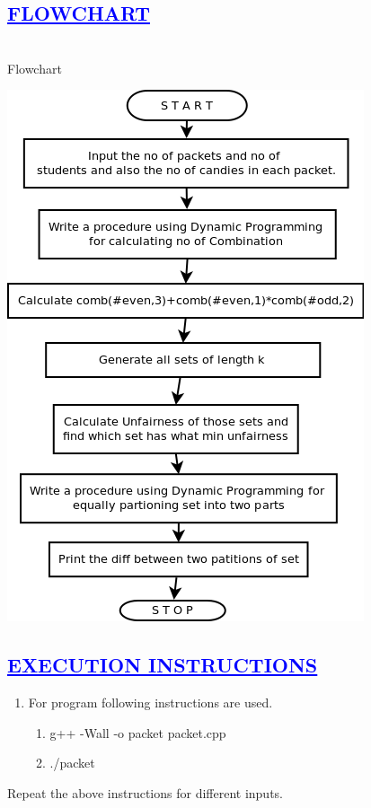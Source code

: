 \documentclass[a4paper,12pt]{report}
\begin{document}
\begin{center}
\chapter{\textcolor{blue}{\underline {FLOWCHART}}}
\end{center}
\noindent \\Flowchart
\begin{center}
\begin{center}
 \includegraphics[width=14 cm,height=12 cm]{./Diagram1.png}
\end{center}

\end{center}

\begin{center}
\chapter{\textcolor{blue}{\underline {EXECUTION INSTRUCTIONS}}}
\end{center}
\begin{enumerate}
 \item For program following instructions are used.
 \begin{enumerate}
  \item g++ -Wall -o packet packet.cpp
\item ./packet
 \end{enumerate}

\end{enumerate}
Repeat the above instructions for different inputs.
\end{document}
